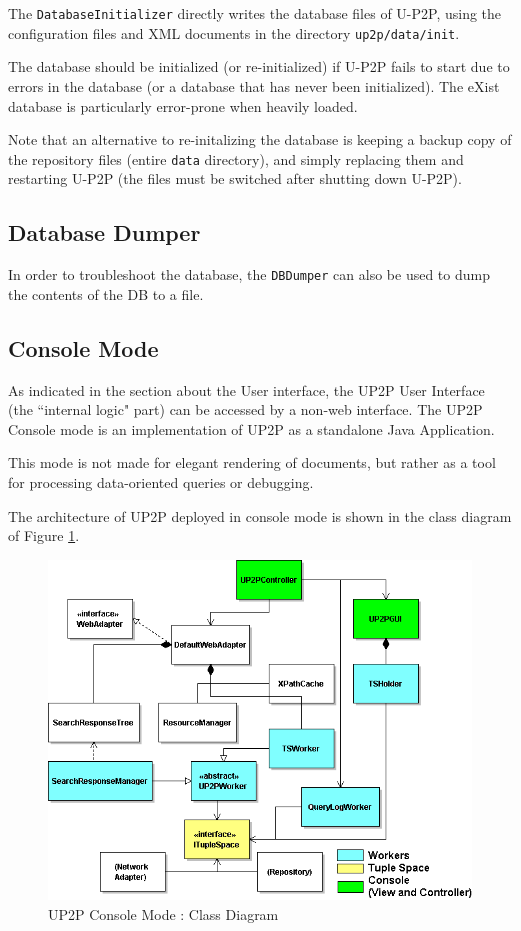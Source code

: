 \documentclass[titlepage]{article}%
\begin{document}
The \verb.DatabaseInitializer. directly writes the database files of U-P2P, using the configuration files and XML documents in the directory \verb.up2p/data/init..

The database should be initialized (or re-initialized) if U-P2P fails to start due to errors in the database (or a database that has never been initialized). The eXist database is particularly error-prone when heavily loaded.

Note that an alternative to re-initalizing the database is keeping a backup copy of the repository files (entire \verb.data. directory), and simply replacing them and restarting U-P2P (the files must be switched after shutting down U-P2P). 

\subsection{Database Dumper}

In order to troubleshoot the database, the \verb.DBDumper. can also be used to dump the contents of the DB to a file.

\subsection{Console Mode}
\label{sec:consolemode}
As indicated in the section about the User interface, the UP2P User Interface (the ``internal logic" part) can be accessed by a non-web interface.
The UP2P Console mode is an implementation of UP2P as a standalone Java Application.

This mode is not made for elegant rendering of documents, but rather as a tool for processing data-oriented queries or debugging.

The architecture of UP2P deployed in console mode is shown in the class diagram of Figure \ref{fig:UP2PConsoleGUIClasses}.
\begin{figure}
	\centering
		\includegraphics[scale=0.5]{diagrams/UP2PConsoleGUIClassesColor.png}
	\caption{UP2P Console Mode : Class Diagram}
	\label{fig:UP2PConsoleGUIClasses}
\end{figure}
\end{document}
